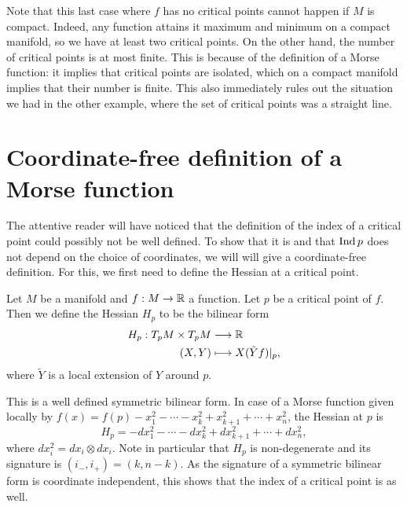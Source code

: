 Note that this last case where $f$ has no critical points cannot happen if $M$ is compact.
Indeed, any function attains it maximum and minimum on a compact manifold, so we have at least two critical points.
On the other hand, the number of critical points is at most finite.
This is because of the definition of a Morse function: it implies that critical points are isolated, which on a compact manifold implies that their number is finite.
This also immediately rules out the situation we had in the other example, where the set of critical points was a straight line.

\section{Coordinate-free definition of a Morse function}

The attentive reader will have noticed that the definition of the index of a critical point could possibly not be well defined.
To show that it is and that $\operatorname{Ind} p$ does not depend on the choice of coordinates, we will will give a coordinate-free definition. For this, we first need to define the Hessian at a critical point.

\begin{definition}
    Let $M$ be a manifold and $f: M \to  \mathbb{R}$ a function.
    Let $p$ be a critical point of $f$.
    Then we define the Hessian $H_p$ to be the bilinear form
    \begin{align*}
        H_p: T_pM \times T_pM &\longrightarrow  \mathbb{R}\\
        (X, Y) &\longmapsto X (\tilde{Y} f)|_p
    ,\end{align*} 
    where $\tilde{Y}$ is a local extension of $Y$ around $p$.
\end{definition}
This is a well defined symmetric bilinear form.
In case of a Morse function given locally by $f(x) = f(p) - x_1^2 - \cdots - x_k^2 + x_{k+1}^2 + \cdots + x_n^2$, the Hessian at $p$ is 
\[
    H_p = - dx_1^2 - \cdots - dx_k^2 + dx_{k+1}^2  + \cdots + dx_n^2
,\] 
where $dx_i^2 = dx_i \otimes dx_i$.
Note in particular that $H_p$ is non-degenerate and its signature is $(i_-, i_{+}) = (k, n-k)$.
As the signature of a symmetric bilinear form is coordinate independent, this shows that the index of a critical point is as well.


